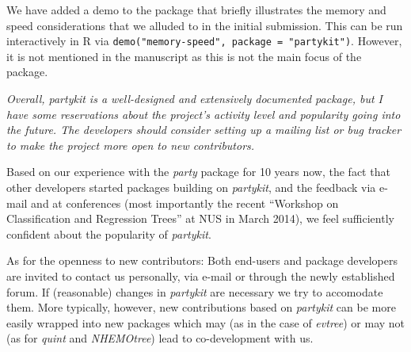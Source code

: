 \documentclass{article}
\begin{document}
\smallskip

We have added a demo to the package that briefly illustrates the
memory and speed considerations that we alluded to in the initial submission.
This can be run interactively in \textsf{R} via
\texttt{demo("memory-speed", package = "partykit")}. However, it is not
mentioned in the manuscript as this is not the main focus of the package.

\medskip

\textit{%
Overall, partykit is a well-designed and extensively documented package, but
I have some reservations about the project's activity level and popularity
going into the future.  The developers should consider setting up a mailing
list or bug tracker to make the project more open to new contributors.
}

\smallskip

Based on our experience with the \emph{party} package for 10 years now, the fact
that other developers started packages building on \emph{partykit}, and the feedback via
e-mail and at conferences (most importantly the recent ``Workshop on Classification
and Regression Trees'' at NUS in March 2014), we feel sufficiently confident
about the popularity of \emph{partykit}.

As for the openness to new contributors: Both end-users and package developers
are invited to contact us personally, via e-mail or through the newly established
forum. If (reasonable) changes in \emph{partykit} are necessary we try to accomodate them.
More typically, however, new contributions based on \emph{partykit} can be more easily
wrapped into new packages which may (as in the case of \emph{evtree}) or may
not (as for \emph{quint} and \emph{NHEMOtree}) lead to co-development with us.



\end{document}
